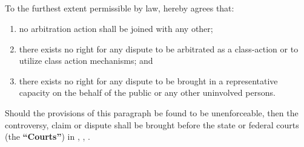 {        \subsection{}
        To the furthest extent permissible by law, \clientbusinessname hereby agrees that:
        \begin{enumerate}
          \item no arbitration action shall be joined with any other;
          \item there exists no right for any dispute to be arbitrated as a class-action or to utilize class action mechanisms; and
          \item there exists no right for any dispute to be brought in a representative capacity on the behalf of the public or any other uninvolved persons.
        \end{enumerate}
        Should the provisions of this paragraph be found to be unenforceable, then the controversy, claim or dispute shall be brought before the state or federal courts (the \textbf{``Courts''}) in \companycity, \companystate, \companycountry.
}


\newcommand{\severability}{
    \section{Severability}
    If a court or other body of competent jurisdiction finds, or the Parties mutually believe, any provision of this Agreement, or portion thereof, to be invalid or unenforceable, such provision will be enforced to the maximum extent permissible so as to affect the intent of the Parties, and the remainder of this Agreement will continue in full force and effect.
}


\newcommand{\entireagreement}{
    \section{Entire Agreement}
    This Agreement expresses the complete understanding of the Parties with respect to the subject matter and supersedes all prior proposals, agreements, representations, and understandings. This Agreement may not be amended except in writing signed by both Parties.
}

